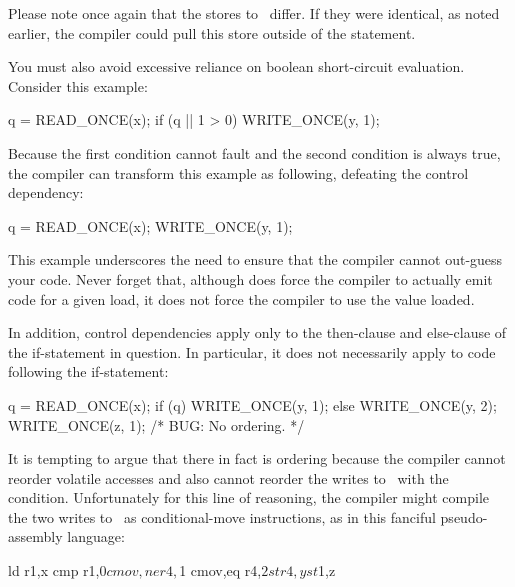 
Please note once again that the stores to~ differ.
If they were identical, as noted earlier, the compiler could pull this
store outside of the  statement.

You must also avoid excessive reliance on boolean short-circuit evaluation.
Consider this example:

\begin{VerbatimN}
q = READ_ONCE(x);
if (q || 1 > 0)
	WRITE_ONCE(y, 1);
\end{VerbatimN}

Because the first condition cannot fault and the second condition is
always true, the compiler can transform this example as following,
defeating the control dependency:

\begin{VerbatimN}
q = READ_ONCE(x);
WRITE_ONCE(y, 1);
\end{VerbatimN}

This example underscores the need to ensure that the compiler cannot
out-guess your code.
Never forget that, although  does force
the compiler to actually emit code for a given load, it does not force
the compiler to use the value loaded.

In addition, control dependencies apply only to the then-clause and
else-clause of the if-statement in question.
In particular, it does
not necessarily apply to code following the if-statement:

\begin{VerbatimN}
q = READ_ONCE(x);
if (q)
	WRITE_ONCE(y, 1);
else
	WRITE_ONCE(y, 2);
WRITE_ONCE(z, 1);  /* BUG: No ordering. */
\end{VerbatimN}

It is tempting to argue that there in fact is ordering because the
compiler cannot reorder volatile accesses and also cannot reorder
the writes to~ with the condition.
Unfortunately for this line
of reasoning, the compiler might compile the two writes to~ as
conditional-move instructions, as in this fanciful pseudo-assembly
language:

\begin{VerbatimN}
ld r1,x
cmp r1,$0
cmov,ne r4,$1
cmov,eq r4,$2
st r4,y
st $1,z
\end{VerbatimN}


